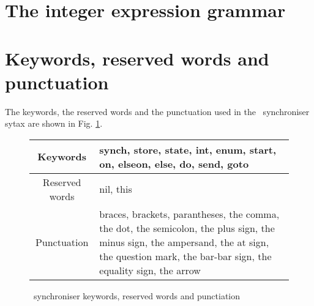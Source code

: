     \section{The integer expression grammar\label{int_exp_gr}}


    \section{Keywords, reserved words and punctuation}
The keywords, the reserved words and the punctuation used in the \ak\ synchroniser sytax are shown in Fig. \ref{sync_kw}.
\begin{figure}[h!]
\centering
\begin{tabular}{|c|p{}|}
\hline
Keywords & synch, store, state, int, enum, start, on, elseon, else, do, send, goto\\
\hline
Reserved words & nil, this\\
\hline
Punctuation & braces, brackets, parantheses, the comma, the dot, the semicolon, the plus sign, the minus sign, the ampersand, the at sign, the question mark, the bar-bar sign, the equality sign, the arrow\\
\hline
\end{tabular}
\caption{\ak\ synchroniser keywords, reserved words and punctiation}
\label{sync_kw}
\end{figure}
